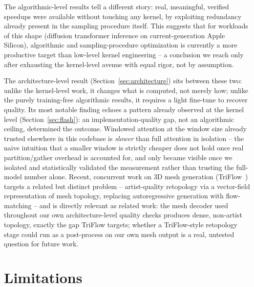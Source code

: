\documentclass[11pt]{article}
\begin{document}
The algorithmic-level results tell a different story: real, meaningful, verified speedups were
available without touching any kernel, by exploiting redundancy already present in the sampling
procedure itself. This suggests that for workloads of this shape (diffusion transformer inference
on current-generation Apple Silicon), algorithmic and sampling-procedure optimization is currently
a more productive target than low-level kernel engineering -- a conclusion we reach only after
exhausting the kernel-level avenue with equal rigor, not by assumption.

The architecture-level result (Section~\ref{sec:architecture}) sits between these two: unlike the
kernel-level work, it changes what is computed, not merely how; unlike the purely training-free
algorithmic results, it requires a light fine-tune to recover quality. Its most notable finding
echoes a pattern already observed at the kernel level (Section~\ref{sec:flash}): an
implementation-quality gap, not an algorithmic ceiling, determined the outcome. Windowed attention
at the window size already trusted elsewhere in this codebase is \emph{slower} than full
attention in isolation -- the naive intuition that a smaller window is strictly cheaper does not
hold once real partition/gather overhead is accounted for, and only became visible once we
isolated and statistically validated the measurement rather than trusting the full-model number
alone. Recent, concurrent work on 3D mesh generation (TriFlow~\cite{triflow}) targets a related
but distinct problem -- artist-quality retopology via a vector-field representation of mesh
topology, replacing autoregressive generation with flow-matching -- and is directly relevant as
related work: the mesh decoder used throughout our own architecture-level quality checks produces
dense, non-artist topology, exactly the gap TriFlow targets; whether a TriFlow-style
retopology stage could run as a post-process on our own mesh output is a real, untested question
for future work.

\section{Limitations}
\end{document}
